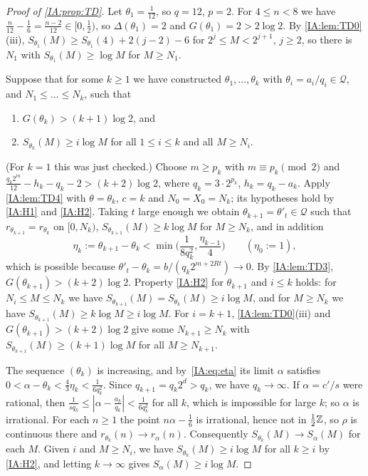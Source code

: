 \begin{proof}[Proof of \cref{IA:prop:TD}]
Let $\theta_1=\frac1{12}$, so $q=12$, $p=2$. For $4\le n<8$ we have
$\frac n{12}-\frac16=\frac{n-2}{12}\in[0,\frac12)$, so $\Delta(\theta_1)=2$ and
$G(\theta_1)=2>2\log2$. By \cref{IA:lem:TD0}(iii), $S_{\theta_1}(M)\ge S_{\theta_1}(4)+2(j-2)-6$ for
$2^j\le M<2^{j+1}$, $j\ge2$, so there is $N_1$ with $S_{\theta_1}(M)\ge\log M$ for $M\ge N_1$.

Suppose that for some $k\ge1$ we have constructed $\theta_1,\dots,\theta_k$ with
$\theta_i=a_i/q_i\in\mathcal Q$, and $N_1\le\dots\le N_k$, such that
\begin{enumerate}[label=(H\arabic*),leftmargin=*]
\item\label{IA:H1} $G(\theta_k)>(k+1)\log2$, and
\item\label{IA:H2} $S_{\theta_k}(M)\ge i\log M$ for all $1\le i\le k$ and all $M\ge N_i$.
\end{enumerate}
(For $k=1$ this was just checked.) Choose $m\ge p_k$ with $m\equiv p_k\pmod2$ and
$\frac{q_k2^m}{12}-h_k-q_k-2>(k+2)\log2$, where $q_k=3\cdot2^{p_k}$, $h_k=q_k-a_k$. Apply
\cref{IA:lem:TD4} with $\theta=\theta_k$, $c=k$ and $N_0=X_0=N_k$; its hypotheses hold by \ref{IA:H1}
and \ref{IA:H2}. Taking $t$ large enough we obtain $\theta_{k+1}=\theta'_t\in\mathcal Q$ such that
$r_{\theta_{k+1}}=r_{\theta_k}$ on $[0,N_k)$, $S_{\theta_{k+1}}(M)\ge k\log M$ for $M\ge N_k$, and in
addition
\begin{equation}\label{IA:eq:eta}
\eta_k:=\theta_{k+1}-\theta_k<\min\Big(\frac1{8q_k^2},\frac{\eta_{k-1}}4\Big)\qquad(\eta_0:=1),
\end{equation}
which is possible because $\theta'_t-\theta_k=b/(q_k2^{m+2Rt})\to0$. By \cref{IA:lem:TD3},
$G(\theta_{k+1})>(k+2)\log2$. Property \ref{IA:H2} for $\theta_{k+1}$ and $i\le k$ holds: for
$N_i\le M\le N_k$ we have $S_{\theta_{k+1}}(M)=S_{\theta_k}(M)\ge i\log M$, and for $M\ge N_k$ we have
$S_{\theta_{k+1}}(M)\ge k\log M\ge i\log M$. For $i=k+1$, \cref{IA:lem:TD0}(iii) and
$G(\theta_{k+1})>(k+2)\log2$ give some $N_{k+1}\ge N_k$ with $S_{\theta_{k+1}}(M)\ge(k+1)\log M$ for
all $M\ge N_{k+1}$.

The sequence $(\theta_k)$ is increasing, and by~\eqref{IA:eq:eta} its limit $\alpha$ satisfies
$0<\alpha-\theta_k<\frac43\eta_k<\frac{1}{6q_k^2}$. Since $q_{k+1}=q_k2^{d}>q_k$, we have
$q_k\to\infty$. If $\alpha=c'/s$ were rational, then $\frac1{sq_k}\le|\alpha-\frac{a_k}{q_k}|
<\frac1{6q_k^2}$ for all $k$, which is impossible for large $k$; so $\alpha$ is irrational. For each
$n\ge1$ the point $n\alpha-\frac16$ is irrational, hence not in $\frac12\mathbb{Z}$, so $\rho$ is continuous
there and $r_{\theta_k}(n)\to r_\alpha(n)$. Consequently $S_{\theta_k}(M)\to S_\alpha(M)$ for each $M$.
Given $i$ and $M\ge N_i$, we have $S_{\theta_k}(M)\ge i\log M$ for all $k\ge i$ by \ref{IA:H2}, and
letting $k\to\infty$ gives $S_\alpha(M)\ge i\log M$.
\end{proof}

